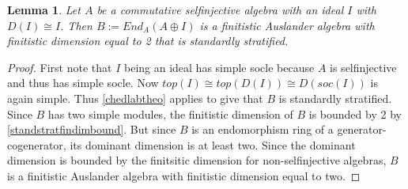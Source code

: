 \documentclass[a4paper]{amsart}
\newtheorem{lemma}[theorem]{Lemma}
\theoremstyle{definition}
\theoremstyle{remark}
\numberwithin{equation}{theorem}
\begin{document}
\begin{lemma} \label{commtheorem}
Let $A$ be a commutative selfinjective algebra with an ideal $I$ with $D(I) \cong I$.
Then $B:=End_A(A \oplus I)$ is a finitistic Auslander algebra with finitistic dimension equal to 2 that is standardly stratified.
\end{lemma}
\begin{proof}
First note that $I$ being an ideal has simple socle because $A$ is selfinjective and thus has simple socle. Now $top(I) \cong top(D(I)) \cong D(soc(I))$ is again simple.
Thus \ref{chedlabtheo} applies to give that $B$ is standardly stratified. Since $B$ has two simple modules, the finitistic dimension of $B$ is bounded by 2 by \ref{standstratfindimbound}. But since $B$ is an endomorphism ring of a generator-cogenerator, its dominant dimension is at least two. Since the dominant dimension is bounded by the finitsitic dimension for non-selfinjective algebras, $B$ is a finitistic Auslander algebra with finitistic dimension equal to two. 
\end{proof}
\end{document}
